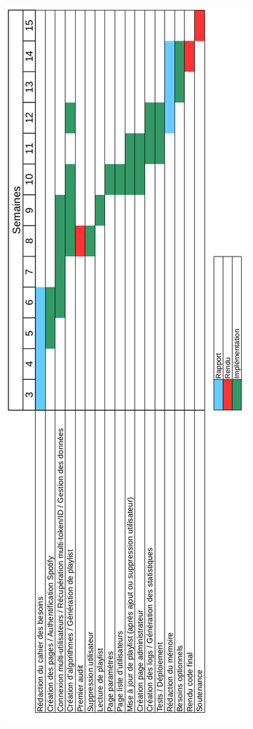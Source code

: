 \documentclass[12pt, openany]{report}
\begin{document}
\includegraphics[scale=0.45]{images/gantt.png}


\cite{Music}
\end{document}
